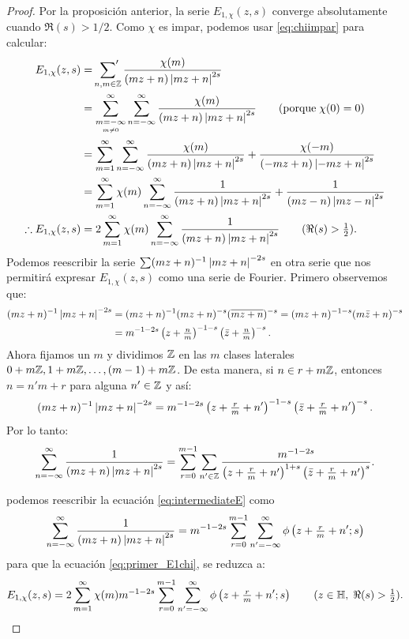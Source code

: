 \begin{proof}
Por la proposici\'on anterior, la serie $E_{1,\chi}(z,s)$ converge absolutamente cuando $\Re(s)>1/2$.
Como $\chi$ es impar, podemos usar \eqref{eq:chiimpar} para calcular:
\begin{align}
  E_{1,\chi}(z,s) & =\sideset{}{'}\sum_{n,m\in\mathbb{Z}}\frac{\chi(m)}{(mz+n)\left| mz+n \right|^{2s}}\nonumber\\
                 & =\sum_{\underset{m\neq0}{m=-\infty}}^{\infty}\sum_{n=-\infty}^{\infty}
                   \frac{\chi(m)}{(mz+n)\left| mz+n \right|^{2s}}\qquad(\text{porque}\;\chi(0)=0)\nonumber\\
                  & =\sum_{m=1}^{\infty}\sum_{n=-\infty}^{\infty}\frac{\chi(m)}{(mz+n)\left| mz+n \right|^{2s}}+
                    \frac{\chi(-m)}{(-mz+n)\left| -mz+n \right|^{2s}}\nonumber\\
                  & =\sum_{m=1}^{\infty}\chi(m)\sum_{n=-\infty}^{\infty}\frac{1}{(mz+n)\left| mz+n \right|^{2s}}+
                    \frac{1}{(mz-n)\left| mz-n \right|^{2s}}\nonumber\\
  \therefore E_{1,\chi}(z,s)& = 2\sum_{m=1}^{\infty}\chi(m)\sum_{n=-\infty}^{\infty}
                    \frac{1}{(mz+n)\left| mz+n \right|^{2s}} \qquad (\Re(s)>\tfrac{1}{2}).\label{eq:primer_E1chi}
\end{align}
Podemos reescribir la serie $\sum(mz+n)^{-1}\left| mz+n \right|^{-2s}$ en otra serie que nos permitir\'a expresar
$E_{1,\chi}(z,s)$ como una serie de Fourier. Primero observemos que:
\begin{align*}
  (mz+n)^{-1}\left| mz+n \right|^{-2s}&=(mz+n)^{-1}(mz+n)^{-s}(\overline{mz+n})^{-s}
                             =(mz+n)^{-1-s}(m\bar{z}+n)^{-s}\\
                            &=m^{-1-2s}\left( z+\tfrac{n}{m} \right)^{-1-s}\left( \bar{z}+\tfrac{n}{m} \right)^{-s}.
\end{align*}
Ahora fijamos un $m$ y dividimos $\mathbb{Z}$ en las $m$ clases laterales $0+m\mathbb{Z},1+m\mathbb{Z},\ldots,(m-1)+m\mathbb{Z}$.
De esta manera, si $n\in r+m\mathbb{Z}$, entonces $n=n'm+r$ para alguna $n'\in\mathbb{Z}$ y as\'i:
\[
  (mz+n)^{-1}\left| mz+n \right|^{-2s}=
  m^{-1-2s}\left( z+\tfrac{r}{m}+n' \right)^{-1-s}\left( \bar{z}+\tfrac{r}{m}+n' \right)^{-s}.
\]
Por lo tanto:
\begin{equation}\label{eq:intermediateE}
\sum_{n=-\infty}^{\infty}\frac{1}{(mz+n)\left| mz+n \right|^{2s}} =
\sum_{r=0}^{m-1}\sum_{n'\in\mathbb{Z}}
\frac{m^{-1-2s}}{\left( z+\tfrac{r}{m}+n' \right)^{1+s}\left( \bar{z}+\tfrac{r}{m}+n' \right)^s}.
\end{equation}


podemos reescribir la ecuaci\'on \eqref{eq:intermediateE} como
\[
  \sum_{n=-\infty}^{\infty}\frac{1}{(mz+n)\left| mz+n \right|^{2s}}=
  m^{-1-2s}\sum_{r=0}^{m-1}\sum_{n'=-\infty}^{\infty}\phi\left( z+\tfrac{r}{m}+n';s \right)
\]
para que la ecuaci\'on \eqref{eq:primer_E1chi}, se reduzca a:
\begin{equation*}
  E_{1,\chi}(z,s)=
  2\sum_{m=1}^{\infty}\chi(m)m^{-1-2s}\sum_{r=0}^{m-1}
  \sum_{n'=-\infty}^{\infty}\phi\left( z+\tfrac{r}{m}+n';s \right)\qquad(z\in\mathbb{H},\;\Re(s)>\tfrac{1}{2}).
\end{equation*}
\end{proof}

